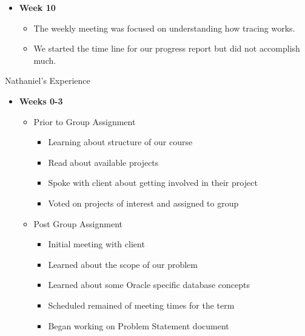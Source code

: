 \documentclass[xcolor=dvipsnames]{beamer}
\begin{document}
\begin{frame}
\begin{itemize}
	\item \textbf{Week 10}
    \begin{itemize}
    	\item The weekly meeting was focused on understanding how tracing works. 
        \item We started the time line for our progress report but did not accomplish much.
	\end{itemize}
\end{itemize}
\end{frame}

\begin{frame}
	\begin{center}
		\huge Nathaniel's Experience
    \end{center}
\end{frame}

\begin{frame}
\begin{itemize}
\item \textbf{Weeks 0-3}
	\begin{itemize}
    	\item Prior to Group Assignment
    	\begin{itemize}
          \item Learning about structure of our course
          \item Read about available projects
          \item Spoke with client about getting involved in their project
          \item Voted on projects of interest and assigned to group
          \end{itemize}
         \item Post Group Assignment
     	 \begin{itemize}
          	\item Initial meeting with client
            \item Learned about the scope of our problem
            \item Learned about some Oracle specific database concepts
            \item Scheduled remained of meeting times for the term
            \item Began working on Problem Statement document
          \end{itemize}
	\end{itemize}
\end{itemize}
\end{frame}
\end{document}
